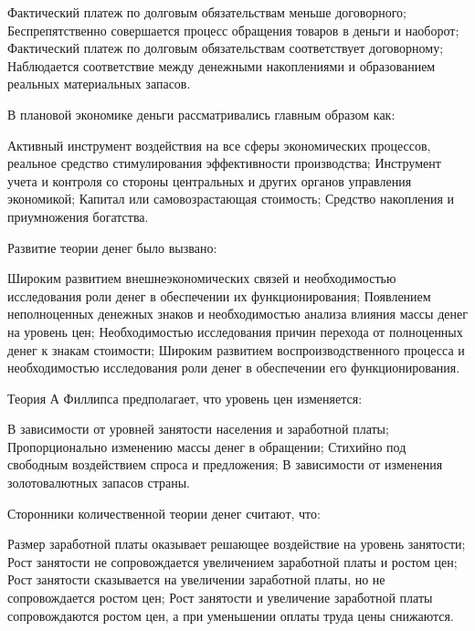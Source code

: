 \documentclass[12pt, table]{exam}
\begin{document}
\begin{questions}
\begin{multicols}{2}
	 \begin{choices}
	 \choice Фактический платеж по долговым обязательствам меньше договорного;
	 \choice Беспрепятственно совершается процесс обращения товаров в деньги и наоборот;
	 \CC Фактический платеж по долговым обязательствам соответствует договорному;
	 \choice Наблюдается соответствие между денежными накоплениями и образованием реальных материальных запасов.
	 \end{choices}
\question В плановой экономике деньги рассматривались главным образом как:
	 \begin{choices}
	 \choice Активный инструмент воздействия на все сферы экономических процессов, реальное средство стимулирования эффективности производства;
	 \CC Инструмент учета и контроля со стороны центральных и других органов управления экономикой;
	 \choice Капитал или самовозрастающая стоимость;
	 \choice Средство накопления и приумножения богатства.
	 \end{choices}
\question Развитие теории денег было вызвано:
	 \begin{choices}
	 \choice Широким развитием внешнеэкономических связей и необходимостью исследования роли денег в обеспечении их функционирования;
	 \CC Появлением неполноценных денежных знаков и необходимостью анализа влияния массы денег на уровень цен;
	 \choice Необходимостью исследования причин перехода от полноценных денег к знакам стоимости;
	 \choice Широким развитием воспроизводственного процесса и необходимостью исследования роли денег в обеспечении его функционирования.
	 \end{choices}
\question Теория А Филлипса предполагает, что уровень цен изменяется:
	 \begin{choices}
	 \CC В зависимости от уровней занятости населения и заработной платы;
	 \choice Пропорционально изменению массы денег в обращении;
	 \choice Стихийно под свободным воздействием спроса и предложения;
	 \choice В зависимости от изменения золотовалютных запасов страны.
	 \end{choices}
\question Сторонники количественной теории денег считают, что:
	 \begin{choices}
	 \choice Размер заработной платы оказывает решающее воздействие на уровень занятости;
	 \choice Рост занятости не сопровождается увеличением заработной платы и ростом цен;
	 \choice Рост занятости сказывается на увеличении заработной платы, но не сопровождается ростом цен;
	 \CC Рост занятости и увеличение заработной платы сопровождаются ростом цен, а при уменьшении оплаты труда цены снижаются.
	 \end{choices}

\end{multicols}
\end{questions}
\end{document}
